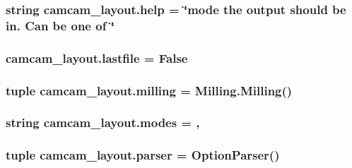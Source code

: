 \subsubsection[{help}]{\setlength{\rightskip}{0pt plus 5cm}string camcam\+\_\+layout.\+help = \char`\"{}mode the output should be in. Can be one of \char`\"{}}\label{namespacecamcam__layout_a0af636005ce49aadd41c5bc3ff4e8bae}
\hypertarget{namespacecamcam__layout_a4d08c4feed053d3ab8a799dd7f3fcec4}{}
\subsubsection[{lastfile}]{\setlength{\rightskip}{0pt plus 5cm}camcam\+\_\+layout.\+lastfile = False}\label{namespacecamcam__layout_a4d08c4feed053d3ab8a799dd7f3fcec4}
\hypertarget{namespacecamcam__layout_aac26a995c03881acd11062893ac5daec}{}
\subsubsection[{milling}]{\setlength{\rightskip}{0pt plus 5cm}tuple camcam\+\_\+layout.\+milling = {\bf Milling.\+Milling}()}\label{namespacecamcam__layout_aac26a995c03881acd11062893ac5daec}
\hypertarget{namespacecamcam__layout_a8dd26061aa3b54fe561f7ed0a9017030}{}
\subsubsection[{modes}]{\setlength{\rightskip}{0pt plus 5cm}string camcam\+\_\+layout.\+modes = \textquotesingle{},\textquotesingle{}}\label{namespacecamcam__layout_a8dd26061aa3b54fe561f7ed0a9017030}
\hypertarget{namespacecamcam__layout_a81d184a591905f9b4ed2f6032fcab2ec}{}
\subsubsection[{parser}]{\setlength{\rightskip}{0pt plus 5cm}tuple camcam\+\_\+layout.\+parser = Option\+Parser()}\label{namespacecamcam__layout_a81d184a591905f9b4ed2f6032fcab2ec}
